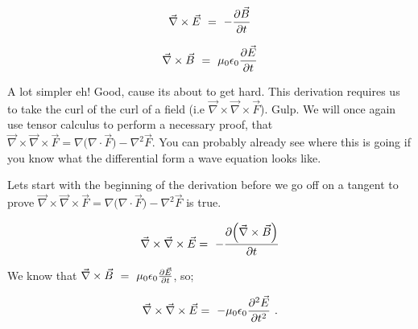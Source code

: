 \documentclass{article}
\begin{document}
\begin{equation} \label{eq:1002}
\vec{\nabla} \times \vec{E} \hspace{0.125cm} = \hspace{0.125cm} -\frac{\partial{\vec{B}}}{\partial{t}}
\end{equation}

\begin{equation} \label{eq:1003}
\vec{\nabla} \times \vec{B} \hspace{0.125cm} = \hspace{0.125cm} \mu_0\epsilon_0\frac{\partial{\vec{E}}}{\partial{t}}
\end{equation}

A lot simpler eh! Good, cause its about to get hard. This derivation requires us to take the curl of the curl of a field (i.e \begin{math} \vec{\nabla}\times\vec{\nabla}\times\vec{F} \end{math}). Gulp. We will once again use tensor calculus to perform a necessary proof, that \begin{math} \vec{\nabla}\times\vec{\nabla}\times\vec{F} = \nabla\big(\nabla\cdot\vec{F}\big) - \nabla^{2}\vec{F} \end{math}. You can probably already see where this is going if you know what the differential form a wave equation looks like. 

Lets start with the beginning of the derivation before we go off on a tangent to prove \begin{math} \vec{\nabla}\times\vec{\nabla}\times\vec{F} = \nabla\big(\nabla\cdot\vec{F}\big) - \nabla^{2}\vec{F} \end{math} is true. 

\begin{equation} \label{eq:1002}
\vec{\nabla}\times\vec{\nabla}\times\vec{E} = \hspace{0.125cm} -\frac{\partial{\Big(\vec{\nabla}\times\vec{B}\Big)}}{\partial{t}}
\end{equation}

We know that \begin{math} \vec{\nabla} \times \vec{B} \hspace{0.125cm} = \hspace{0.125cm} \mu_0\epsilon_0\frac{\partial{\vec{E}}}{\partial{t}} \end{math}, so;

\begin{equation} \label{eq:1002}
\vec{\nabla}\times\vec{\nabla}\times\vec{E} = \hspace{0.125cm} -\mu_{0}\epsilon_{0}\frac{\partial^{2}{\vec{E}}}{\partial{t}^{2}} \hspace{0.125cm}. 
\end{equation}
\end{document}
